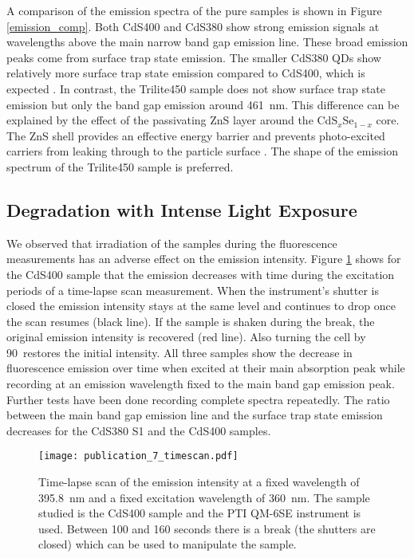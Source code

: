 \documentclass[cits]{JINST}
\begin{document}
A comparison of the emission spectra of the pure samples is shown in Figure \ref{emission_comp}. Both CdS400 and CdS380 show strong emission signals at wavelengths above the main narrow band gap emission line. These broad emission peaks come from surface trap state emission. The smaller CdS380 QDs show relatively more surface trap state emission compared to CdS400, which is expected \cite{capek}. In contrast, the Trilite450 sample does not show surface trap state emission but only the band gap emission around 461~nm. This difference can be explained by the effect of the passivating ZnS layer around the CdS$_x$Se$_{1-x}$ core. The ZnS shell provides an effective energy barrier and prevents photo-excited carriers from leaking through to the particle surface \cite{dabbousi1997}. The shape of the emission spectrum of the Trilite450 sample is preferred.

\subsection{Degradation with Intense Light Exposure}
We observed that irradiation of the samples during the fluorescence measurements has an adverse effect on the emission intensity. Figure \ref{time_scan} shows for the CdS400 sample that the emission decreases with time during the excitation periods of a time-lapse scan measurement. When the instrument's shutter is closed the emission intensity stays at the same level and continues to drop once the scan resumes (black line). If the sample is shaken during the break, the original emission intensity is recovered (red line). Also turning the cell by 90\textdegree ~restores the initial intensity. All three samples show the decrease in fluorescence emission over time when excited at their main absorption peak while recording at an emission wavelength fixed to the main band gap emission peak. Further tests have been done recording complete spectra repeatedly. The ratio between the main band gap emission line and the surface trap state emission decreases for the CdS380 S1 and the CdS400 samples. 

\begin{figure}[tbh]
      \begin{center}
        \texttt{[image: publication\_7\_timescan.pdf]}
        \caption[]{Time-lapse scan of the emission intensity at a fixed wavelength of 395.8~nm and a fixed excitation wavelength of 360~nm. The sample studied is the CdS400 sample and the PTI QM-6SE instrument is used. Between 100 and 160 seconds there is a break (the shutters are closed) which can be used to manipulate the sample. \label{time_scan}}
        \end{center}
\end{figure}
\end{document}
